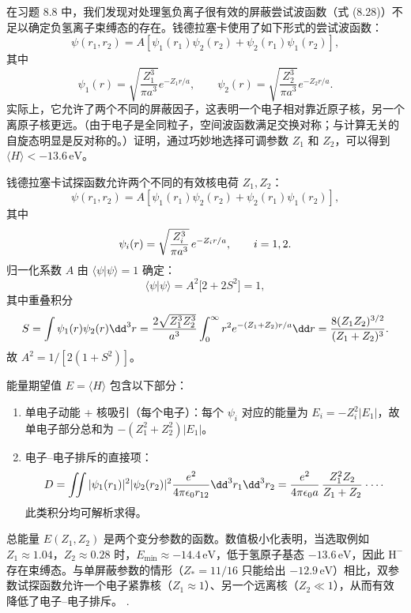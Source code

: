 \begin{question}
在习题 8.8 中，我们发现对处理氢负离子很有效的屏蔽尝试波函数（式 (8.28)）不足以确定负氢离子束缚态的存在。钱德拉塞卡使用了如下形式的尝试波函数：
\[
\psi(r_1,r_2)=A[\psi_1(r_1)\psi_2(r_2)+\psi_2(r_1)\psi_1(r_2)],
\]
其中
\[
\psi_1(r)=\sqrt{\frac{Z_1^3}{\pi a^3}}e^{-Z_1r/a},\qquad
\psi_2(r)=\sqrt{\frac{Z_2^3}{\pi a^3}}e^{-Z_2r/a}.
\]
实际上，它允许了两个不同的屏蔽因子，这表明一个电子相对靠近原子核，另一个离原子核更远。（由于电子是全同粒子，空间波函数满足交换对称；与计算无关的自旋态明显是反对称的。）证明，通过巧妙地选择可调参数 $Z_1$ 和 $Z_2$，可以得到 $\langle H\rangle<-13.6\,\mathrm{eV}$。

\par\smallskip
{}

\end{question}
\begin{solution}
钱德拉塞卡试探函数允许两个不同的有效核电荷 $Z_1,Z_2$：
\[
\psi(r_1,r_2)=A[\psi_1(r_1)\psi_2(r_2)+\psi_2(r_1)\psi_1(r_2)],
\]
其中
\[
\psi_i(r)=\sqrt{Z_i^3\over\pi a^3}\,e^{-Z_i r/a},\qquad i=1,2.
\]
归一化系数 $A$ 由 $\langle\psi|\psi\rangle=1$ 确定：
\[
\langle\psi|\psi\rangle=A^2\bigl[2+2S^2\bigr]=1,
\]
其中重叠积分
\[
S=\int\psi_1(r)\psi_2(r)\dd^3r
={2\sqrt{Z_1^3Z_2^3}\over a^3}\int_0^\infty r^2 e^{-(Z_1+Z_2)r/a}\dd r
={8(Z_1Z_2)^{3/2}\over(Z_1+Z_2)^3}.
\]
故 $A^2=1/[2(1+S^2)]$。

能量期望值 $E=\langle H\rangle$ 包含以下部分：
\begin{enumerate}
\item 单电子动能 + 核吸引（每个电子）：每个 $\psi_i$ 对应的能量为 $E_i=-Z_i^2|E_1|$，故单电子部分总和为 $-(Z_1^2+Z_2^2)|E_1|$。
\item 电子--电子排斥的直接项：
\[
D=\iint|\psi_1(r_1)|^2|\psi_2(r_2)|^2{e^2\over4\pi\epsilon_0 r_{12}}\dd^3r_1\dd^3r_2
={e^2\over4\pi\epsilon_0 a}\,{Z_1^2Z_2\over Z_1+Z_2}\cdot\cdots
\]
此类积分均可解析求得。
\end{enumerate}

总能量 $E(Z_1,Z_2)$ 是两个变分参数的函数。数值极小化表明，当选取例如 $Z_1\approx1.04$，$Z_2\approx0.28$ 时，$E_{\min}\approx-14.4\,\mathrm{eV}$，低于氢原子基态 $-13.6\,\mathrm{eV}$，因此 $\mathrm H^-$ 存在束缚态。与单屏蔽参数的情形（$Z_*=11/16$ 只能给出 $-12.9\,\mathrm{eV}$）相比，双参数试探函数允许一个电子紧靠核（$Z_1\approx1$）、另一个远离核（$Z_2\ll1$），从而有效降低了电子--电子排斥。
.
\end{solution}

